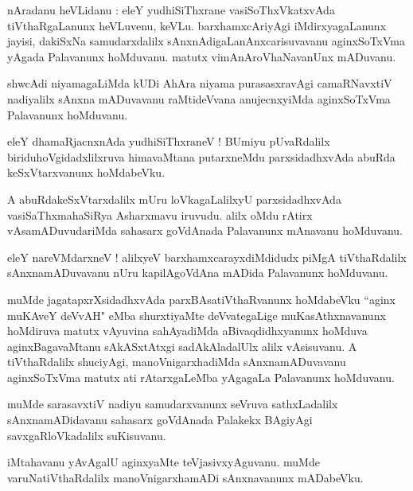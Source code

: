 \documentclass{article}
\begin{document}
\begin{mn}
nAradanu heVLidanu : eleY yudhiSiThxrane vasiSoThxVkatxvAda tiVthaRgaLanunx heVLuvenu, keVLu.
barxhamxcAriyAgi iMdirxyagaLanunx jayisi, dakiSxNa samudarxdalilx sAnxnAdigaLanAnxcarisuvavanu 
aginxSoTxVma yAgada Palavanunx hoMduvanu. matutx vimAnAroVhaNavanUnx mADuvanu.
\end{mn}

\begin{mn}
shwcAdi niyamagaLiMda kUDi AhAra niyama purasasxravAgi camaRNavxtiV nadiyalilx sAnxna mADuvavanu 
raMtideVvana anujecnxyiMda aginxSoTxVma Palavanunx hoMduvanu.
\end{mn}

\begin{mn}
eleY dhamaRjacnxnAda yudhiSiThxraneV ! BUmiyu pUvaRdalilx biriduhoVgidadxlilxruva himavaMtana 
putarxneMdu parxsidadhxvAda abuRda keSxVtarxvanunx hoMdabeVku.
\end{mn}

\begin{mn}
A abuRdakeSxVtarxdalilx mUru loVkagaLalilxyU parxsidadhxvAda vasiSaThxmahaSiRya Asharxmavu iruvudu.
alilx oMdu rAtirx vAsamADuvudariMda sahasarx goVdAnada Palavanunx mAnavanu hoMduvanu.
\end{mn}

\begin{mn}
eleY nareVMdarxneV ! alilxyeV barxhamxcarayxdiMdidudx piMgA tiVthaRdalilx  sAnxnamADuvavanu nUru 
kapilAgoVdAna mADida Palavanunx hoMduvanu.
\end{mn}

\begin{mn}
muMde jagatapxrXsidadhxvAda parxBAsatiVthaRvanunx hoMdabeVku ``aginx muKAveY deVvAH" eMba 
shurxtiyaMte deVvategaLige muKasAthxnavanunx hoMdiruva matutx vAyuvina sahAyadiMda 
aBivaqdidhxyanunx hoMduva aginxBagavaMtanu sAkASxtAtxgi sadAkAladalUlx alilx vAsisuvanu. A
tiVthaRdalilx  shuciyAgi, manoVnigarxhadiMda sAnxnamADuvavanu aginxSoTxVma matutx 
ati rAtarxgaLeMba yAgagaLa Palavanunx hoMduvanu. 
\end{mn}

\begin{mn}
muMde sarasavxtiV nadiyu samudarxvanunx seVruva sathxLadalilx sAnxnamADidavanu sahasarx goVdAnada 
Palakekx BAgiyAgi savxgaRloVkadalilx suKisuvanu.
\end{mn}

\begin{mn}
iMtahavanu yAvAgalU aginxyaMte teVjasivxyAguvanu. muMde varuNatiVthaRdalilx manoVnigarxhamADi
sAnxnavanunx mADabeVku.
\end{mn}
\end{document}
